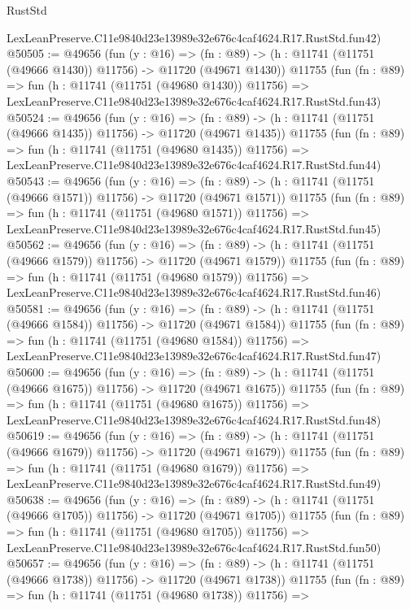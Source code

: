 \begin{lexlean}{RustStd}
\begin{coremodule}
    LexLeanPreserve.C11e9840d23e13989e32e676c4caf4624.R17.RustStd.fun42)
@50505 := @49656
    (fun (y : @16) =>
    (fn : @89) -> (h : @11741 (@11751 (@49666 @1430)) @11756) -> @11720 (@49671 @1430))
    @11755
    (fun (fn : @89) =>
    fun (h : @11741 (@11751 (@49680 @1430)) @11756) =>
    LexLeanPreserve.C11e9840d23e13989e32e676c4caf4624.R17.RustStd.fun43)
@50524 := @49656
    (fun (y : @16) =>
    (fn : @89) -> (h : @11741 (@11751 (@49666 @1435)) @11756) -> @11720 (@49671 @1435))
    @11755
    (fun (fn : @89) =>
    fun (h : @11741 (@11751 (@49680 @1435)) @11756) =>
    LexLeanPreserve.C11e9840d23e13989e32e676c4caf4624.R17.RustStd.fun44)
@50543 := @49656
    (fun (y : @16) =>
    (fn : @89) -> (h : @11741 (@11751 (@49666 @1571)) @11756) -> @11720 (@49671 @1571))
    @11755
    (fun (fn : @89) =>
    fun (h : @11741 (@11751 (@49680 @1571)) @11756) =>
    LexLeanPreserve.C11e9840d23e13989e32e676c4caf4624.R17.RustStd.fun45)
@50562 := @49656
    (fun (y : @16) =>
    (fn : @89) -> (h : @11741 (@11751 (@49666 @1579)) @11756) -> @11720 (@49671 @1579))
    @11755
    (fun (fn : @89) =>
    fun (h : @11741 (@11751 (@49680 @1579)) @11756) =>
    LexLeanPreserve.C11e9840d23e13989e32e676c4caf4624.R17.RustStd.fun46)
@50581 := @49656
    (fun (y : @16) =>
    (fn : @89) -> (h : @11741 (@11751 (@49666 @1584)) @11756) -> @11720 (@49671 @1584))
    @11755
    (fun (fn : @89) =>
    fun (h : @11741 (@11751 (@49680 @1584)) @11756) =>
    LexLeanPreserve.C11e9840d23e13989e32e676c4caf4624.R17.RustStd.fun47)
@50600 := @49656
    (fun (y : @16) =>
    (fn : @89) -> (h : @11741 (@11751 (@49666 @1675)) @11756) -> @11720 (@49671 @1675))
    @11755
    (fun (fn : @89) =>
    fun (h : @11741 (@11751 (@49680 @1675)) @11756) =>
    LexLeanPreserve.C11e9840d23e13989e32e676c4caf4624.R17.RustStd.fun48)
@50619 := @49656
    (fun (y : @16) =>
    (fn : @89) -> (h : @11741 (@11751 (@49666 @1679)) @11756) -> @11720 (@49671 @1679))
    @11755
    (fun (fn : @89) =>
    fun (h : @11741 (@11751 (@49680 @1679)) @11756) =>
    LexLeanPreserve.C11e9840d23e13989e32e676c4caf4624.R17.RustStd.fun49)
@50638 := @49656
    (fun (y : @16) =>
    (fn : @89) -> (h : @11741 (@11751 (@49666 @1705)) @11756) -> @11720 (@49671 @1705))
    @11755
    (fun (fn : @89) =>
    fun (h : @11741 (@11751 (@49680 @1705)) @11756) =>
    LexLeanPreserve.C11e9840d23e13989e32e676c4caf4624.R17.RustStd.fun50)
@50657 := @49656
    (fun (y : @16) =>
    (fn : @89) -> (h : @11741 (@11751 (@49666 @1738)) @11756) -> @11720 (@49671 @1738))
    @11755
    (fun (fn : @89) =>
    fun (h : @11741 (@11751 (@49680 @1738)) @11756) =>

\end{coremodule}
\end{lexlean}
